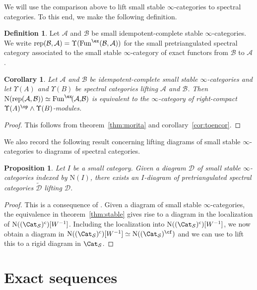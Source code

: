 \documentclass{amsart}
\let\sma\wedge
\newcommand{\htp}{\simeq}
\newcommand{\cD}{{\mathcal D}}
\let\catsymbfont\mathcal
\newcommand{\aA}{{\catsymbfont{A}}}
\newcommand{\aB}{{\catsymbfont{B}}}
\newcommand{\N}{\mathrm{N}}
\newcommand{\idemfun}{\Fun^{\ex}}
\newcommand{\Fun}{\mathrm{Fun}} %
\newcommand{\Spcat}{\Cat_\mathcal{S}}%
\renewcommand{\i}{\infty}
\newcommand{\rep}{\mathrm{rep}} %
\newcommand{\spect}{\Upsilon}
\numberwithin{equation}{section}
\newtheorem{corollary}[equation]{Corollary}
\newtheorem{proposition}[equation]{Proposition}
\theoremstyle{definition}
\newtheorem{definition}[equation]{Definition}
\begin{document}
We will use the comparison above to lift small stable $\i$-categories
to spectral categories.  To this end, we make the following definition.

\begin{definition}\label{def:rep}
Let $\aA$ and $\aB$ be small idempotent-complete stable
$\i$-categories.  We write $\rep(\aB,\aA)=\spect(\Fun^{\ex}(\aB,\aA))$
for the small pretriangulated spectral category associated to the
small stable $\i$-category of exact functors from $\aB$ to $\aA$.
\end{definition}

\begin{corollary}\label{cor:rep}
Let $\aA$ and $\aB$ be idempotent-complete small stable
$\i$-categories and let $\spect(A)$ and $\spect(B)$
be spectral categories lifting $\aA$ and $\aB$.
Then $\N(\rep(\aA,\aB))\simeq\idemfun\!(\aA,\!\aB)$ is equivalent to the
$\i$-category of right-compact
$\spect(A)^{\op}\sma\spect(B)$-modules.
\end{corollary}

\begin{proof}
This follows from theorem~\ref{thm:morita} and
corollary~\ref{cor:toencor}.
\end{proof}

We also record the following result concerning lifting diagrams of
small stable $\infty$-categories to diagrams of spectral categories. 

\begin{proposition}\label{prop:genlift}
Let $I$ be a small category.  Given a diagram $\cD$ of small stable
$\i$-categories indexed by $\N(I)$, there exists an $I$-diagram of
pretriangulated spectral categories $\widetilde{\cD}$ lifting $\cD$.
\end{proposition}

\begin{proof}
This is a consequence of \cite[4.2.4.4]{HTT}.  Given a diagram of
small stable $\i$-categories, the equivalence in
theorem~\ref{thm:stable} gives rise to a diagram in the localization
of $\N((\Spcat)^{\mathrm{c}})[W^{-1}]$.  Including the localization
into $\N((\Spcat)^{\mathrm{c}})[W^{-1}]$, we now obtain a diagram in
$\N((\Spcat)^{\mathrm{c}})[W^{-1}] \htp \N((\Spcat)^{\cf})$ and we can
use \cite[4.2.4.4]{HTT} to lift this to a rigid diagram in $\Spcat$.
\end{proof}

\section{Exact sequences}\label{sec:exact}
\end{document}
